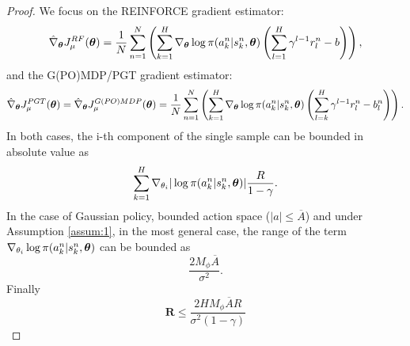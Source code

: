 \secondlemma*
\begin{proof}
We focus on the REINFORCE\cite{Williams1992} gradient estimator:
\[
\hat{\nabla}_{\boldsymbol{\theta}}J_{\mu}^{RF}(\boldsymbol{\theta}) = 
	\frac{1}{N}\sum\limits_{n=1}^N\left(
	\sum\limits_{k=1}^H\nabla_{\boldsymbol{\theta}}\log\pi(a_k^n|s_k^n,\boldsymbol{\theta})
	\left(\sum\limits_{l=1}^H\gamma^{l-1}r_l^n-b\right)\right),
\]
and the G(PO)MDP\cite{bb-ihgbps-01}/PGT\cite{Sutton1999a} gradient estimator:
\[
\hat{\nabla}_{\boldsymbol{\theta}}J_{\mu}^{PGT}(\boldsymbol{\theta}) = \hat{\nabla}_{\boldsymbol{\theta}}J_{\mu}^{G(PO)MDP}(\boldsymbol{\theta}) = 
	\frac{1}{N}\sum\limits_{n=1}^N\left(
	\sum\limits_{k=1}^H\nabla_{\boldsymbol{\theta}}\log\pi(a_k^n|s_k^n,\boldsymbol{\theta})
	\left(\sum\limits_{l=k}^H\gamma^{l-1}r_l^n-b_l^n\right)\right).
\]
In both cases, the i-th component of the single sample can be bounded in absolute value as
\[
\sum\limits_{k=1}^H\nabla_{\theta_i}|\log\pi(a_k^n|s_k^n,\boldsymbol{\theta})|\frac{R}{1-\gamma}.
\]
In the case of Gaussian policy, bounded action space ($|a| \leq \overline{A}$) and under Assumption \ref{assum:1}, in the most general case, the range of the term $\nabla_{\theta_i}\log\pi(a_k^n|s_k^n,\boldsymbol{\theta})$ can be bounded as
\[
\frac{2M_{\phi}\overline{A}}{\sigma^2}.
\] 
Finally
\[
\mathbf{R} \leq \frac{2HM_{\phi}\overline{A}R}{\sigma^2(1-\gamma)}
\]
\end{proof}